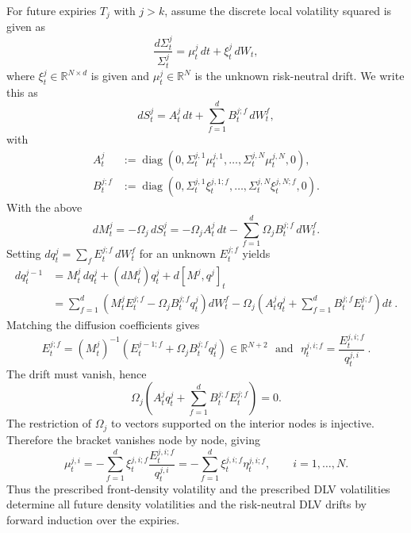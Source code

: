 \documentclass[smallextended,envcountsame,envcountsect]{svjour3}
\begin{document}
      For future expiries $T_j$ with $j>k$, assume the discrete local volatility squared is given as
      \begin{equation}
        \label{eq:dlv_sde_hb}
        \frac{ d\Sigma_t^{j} }{ \Sigma_t^{j} }
          = \mu^j_t\,dt
          + \xi^j_t\,dW_t,
      \end{equation}
      where $\xi_t^j\in\mathbb R^{N\times d}$ is given and
      $\mu_t^j\in\mathbb R^N$ is the unknown risk-neutral drift. We write this as
      \[
        dS_t^j=A_t^j\,dt+\sum_{f=1}^dB_t^{j;f}\,dW_t^f,
      \]
      with
      \begin{align*}
        A_t^j
        &:=\operatorname{diag}(0,\Sigma_t^{j,1}\mu_t^{j,1},\ldots,
            \Sigma_t^{j,N}\mu_t^{j,N},0),\\
        B_t^{j;f}
        &:=\operatorname{diag}(0,\Sigma_t^{j,1}\xi_t^{j,1;f},\ldots,
            \Sigma_t^{j,N}\xi_t^{j,N;f},0).
      \end{align*}
      With the above
      \[
        dM_t^j=-\Omega_j\,dS_t^j
        =-\Omega_jA_t^j\,dt
        -\sum_{f=1}^d\Omega_jB_t^{j;f}\,dW_t^f.
      \]
      Setting $dq_t^j=\sum_fE_t^{j;f}\,dW_t^f$ for an unknown $E_t^{j;f}$ yields
      \begin{align}
        dq_t^{j-1}
        &= M_t^j\,dq_t^j+(dM_t^j)q_t^j+d[M^j,q^j]_t\\
        &= \sum_{f=1}^d
          \left(M_t^jE_t^{j;f}-\Omega_jB_t^{j;f}q_t^j\right)dW_t^f
          -\Omega_j\left(A_t^jq_t^j
          +\sum_{f=1}^dB_t^{j;f}E_t^{j;f}\right)dt \ . \nonumber
      \end{align}
      Matching the diffusion coefficients gives
      \begin{equation}
        \label{eq:vol_hb}
        E_t^{j;f}
        =(M_t^j)^{-1}
          \left(E_t^{j-1;f}+\Omega_jB_t^{j;f}q_t^j\right)
        \in\mathbb R^{N+2} \ \ \ \mbox{and} \ \ \ \eta_t^{j,i;f}=\frac{ E_t^{j,i;f} }{ q_t^{j,i} } \ .
      \end{equation}
      The drift must vanish, hence
      \[
        \Omega_j\left(A_t^jq_t^j
        +\sum_{f=1}^dB_t^{j;f}E_t^{j;f}\right)=0.
      \]
      The restriction of $\Omega_j$ to vectors supported on the interior nodes
      is injective. Therefore the bracket vanishes node by node, giving
      \begin{equation}
        \label{eq:drift_hb}
        \mu_t^{j,i}
        =-\sum_{f=1}^d\xi_t^{j,i;f}
          \frac{E_t^{j,i;f}}{q_t^{j,i}}
        =-\sum_{f=1}^d\xi_t^{j,i;f}\eta_t^{j,i;f},
        \qquad i=1,\ldots,N.
      \end{equation}
      Thus the prescribed front-density volatility and the prescribed DLV
      volatilities determine all future density volatilities and the
      risk-neutral DLV drifts by forward induction over the expiries.
\end{document}
